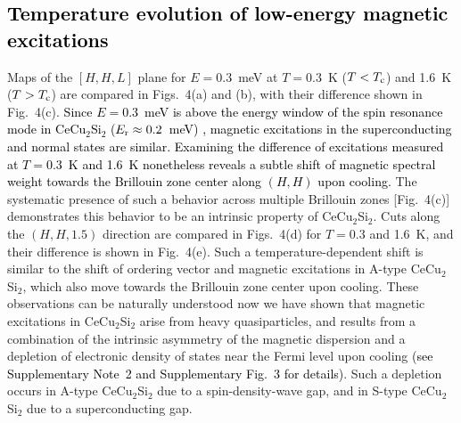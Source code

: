 \documentclass[aps,prl,onecolumn,amsmath,amssymb,superscriptaddress]{revtex4}
\newcommand{\ys}{\textcolor{black}}
\newcommand{\yy}{\textcolor{black}}
\begin{document}
\yy{\subsection{Temperature evolution of low-energy magnetic excitations}}

Maps of the $[H,H,L]$ plane for $E=0.3$~meV at $T=0.3$~K ($T<T_{\rm c}$) and 1.6~K ($T>T_{\rm c}$) are compared in Figs.~4(a) and (b), with their difference shown in Fig.~4(c). %
\ys{Since $E = 0.3$~meV is above the energy window of the spin resonance mode in CeCu$_2$Si$_2$ ($E_{\rm r}\approx0.2$~meV) \cite{OStockert2011}, magnetic excitations in the superconducting and normal states are similar. Examining the difference of excitations measured at $T =0.3$~K and 1.6~K nonetheless reveals a subtle shift of magnetic spectral weight towards the Brillouin zone center along $(H,H)$ upon cooling.}
The systematic presence of such a behavior across multiple Brillouin zones [Fig.~4(c)] demonstrates this behavior to be an intrinsic property of CeCu$_2$Si$_2$.
Cuts along the $(H,H,1.5)$ direction are compared in Figs.~4(d) for $T=0.3$ and 1.6~K, and their difference is shown in Fig.~4(e). Such a temperature-dependent shift is similar to the shift of ordering vector \cite{OStockert2004} and magnetic excitations \cite{JArndt2011} in A-type CeCu$_2$Si$_2$, which also move towards the Brillouin zone center upon cooling. 
These observations can be naturally understood now we have shown that magnetic excitations in CeCu$_2$Si$_2$ arise from heavy quasiparticles, and results from a combination of the intrinsic asymmetry of the magnetic dispersion and a depletion of electronic density of states near the Fermi level upon cooling \ys{(see Supplementary Note~2 and Supplementary Fig.~3 for details)}. Such a depletion occurs in A-type CeCu$_2$Si$_2$ due to a spin-density-wave gap, and in S-type CeCu$_2$Si$_2$ due to a superconducting gap. 
\end{document}
